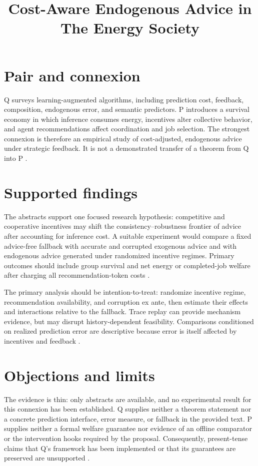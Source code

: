 \documentclass{article}
\title{Cost-Aware Endogenous Advice in The Energy Society}
\begin{document}
\maketitle

\section{Pair and connexion}

Q surveys learning-augmented algorithms, including prediction cost, feedback, composition, endogenous error, and semantic predictors. P introduces a survival economy in which inference consumes energy, incentives alter collective behavior, and agent recommendations affect coordination and job selection. The strongest connexion is therefore an empirical study of cost-adjusted, endogenous advice under strategic feedback. It is not a demonstrated transfer of a theorem from Q into P .

\section{Supported findings}

The abstracts support one focused research hypothesis: competitive and cooperative incentives may shift the consistency--robustness frontier of advice after accounting for inference cost. A suitable experiment would compare a fixed advice-free fallback with accurate and corrupted exogenous advice and with endogenous advice generated under randomized incentive regimes. Primary outcomes should include group survival and net energy or completed-job welfare after charging all recommendation-token costs .

The primary analysis should be intention-to-treat: randomize incentive regime, recommendation availability, and corruption ex ante, then estimate their effects and interactions relative to the fallback. Trace replay can provide mechanism evidence, but may disrupt history-dependent feasibility. Comparisons conditioned on realized prediction error are descriptive because error is itself affected by incentives and feedback .

\section{Objections and limits}

The evidence is thin: only abstracts are available, and no experimental result for this connexion has been established. Q supplies neither a theorem statement nor a concrete prediction interface, error measure, or fallback in the provided text. P supplies neither a formal welfare guarantee nor evidence of an offline comparator or the intervention hooks required by the proposal. Consequently, present-tense claims that Q's framework has been implemented or that its guarantees are preserved are unsupported .
\end{document}
